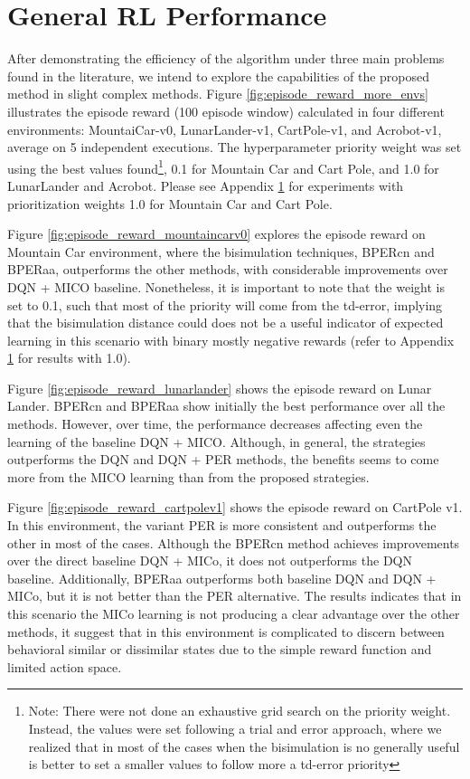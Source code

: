 \section{General RL Performance}

After demonstrating the efficiency of the algorithm under three main problems found in the literature, we intend to explore the capabilities of the proposed method in slight complex methods. Figure \ref{fig:episode_reward_more_envs} illustrates the episode reward (100 episode window) calculated in four different environments: MountaiCar-v0, LunarLander-v1, CartPole-v1, and Acrobot-v1, average on 5 independent executions. The hyperparameter priority weight was set using the best values found\footnote{Note: There were not done an exhaustive grid search on the priority weight. Instead, the values were set following a trial and error approach, where we realized that in most of the cases when the bisimulation is no generally useful is better to set a smaller values to follow more a td-error priority}, 0.1 for Mountain Car and Cart Pole, and 1.0 for LunarLander and Acrobot. Please see Appendix \ref{} for experiments with prioritization weights 1.0 for Mountain Car and Cart Pole.

Figure \ref{fig:episode_reward_mountaincarv0} explores the episode reward on Mountain Car environment, where the bisimulation techniques, BPERcn and BPERaa, outperforms the other methods, with considerable improvements over DQN + MICO baseline. Nonetheless, it is important to note that the weight is set to 0.1, such that most of the priority will come from the td-error, implying that the bisimulation distance could does not be a useful indicator of expected learning in this scenario with binary mostly negative rewards (refer to Appendix \ref{} for results with 1.0). 

Figure \ref{fig:episode_reward_lunarlander} shows the episode reward on Lunar Lander. BPERcn and BPERaa show initially the best performance over all the methods. However, over time, the performance decreases affecting even the learning of the baseline DQN + MICO. Although, in general, the strategies outperforms the DQN and DQN + PER methods, the benefits seems to come more from the MICO learning than from the proposed strategies. 

Figure \ref{fig:episode_reward_cartpolev1} shows the episode reward on CartPole v1. In this environment, the variant PER is more consistent and outperforms the other in most of the cases. Although the BPERcn method achieves improvements over the direct baseline DQN + MICo, it does not outperforms the DQN baseline. Additionally, BPERaa outperforms both baseline DQN and DQN + MICo, but it is not better than the PER alternative. The results indicates that in this scenario the MICo learning is not producing a clear advantage over the other methods, it suggest that in this environment is complicated to discern between behavioral similar or dissimilar states due to the simple reward function and limited action space.

